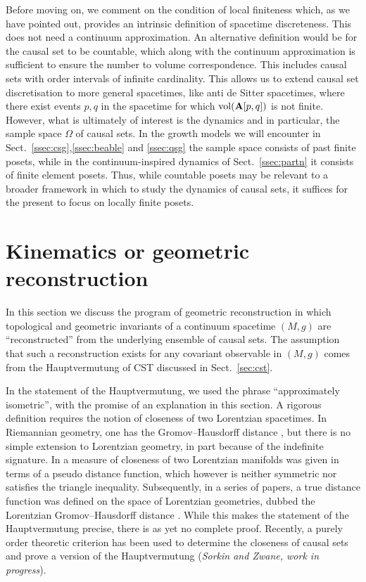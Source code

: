 Before moving on, we comment on the condition of local finiteness which, as we have pointed out,   provides an intrinsic
  definition of spacetime discreteness. This does not need a continuum approximation. An alternative definition would be
  for the causal set to be  countable, which along with the continuum approximation is sufficient to ensure the number
  to volume correspondence. This includes causal sets with  order intervals of infinite cardinality. This
  allows us to extend  causal set discretisation to more general spacetimes, like anti de Sitter spacetimes, where there
exist  events $p,q$ in the spacetime for which  $\mathrm{vol}(\mathbf A[p,q])$ is not finite. However, what is ultimately of
interest is the dynamics and in particular, the sample space $\Omega$ of causal sets. In the growth models we will encounter in 
Sect.~\ref{ssec:csg},\ref{ssec:beable} and \ref{ssec:qsg} the sample space consists of past finite posets, while in the
continuum-inspired dynamics of Sect.~\ref{ssec:partn} it consists of finite element posets. Thus, while countable posets may be relevant to a broader
framework in which to study the  dynamics of causal sets, it suffices for the present to focus on locally finite
posets. 



\section{Kinematics or geometric reconstruction}
\label{sec:kinematics} 

In this section we discuss the program of geometric reconstruction in which topological and geometric
invariants of a continuum spacetime $(M,g)$ are ``reconstructed'' from the  underlying ensemble of causal sets. The assumption that such a reconstruction
exists for any covariant observable in $(M,g)$ comes from the Hauptvermutung of CST discussed in Sect.~\ref{sec:cst}.


In the statement of the Hauptvermutung,  we used the phrase ``approximately
isometric'', with the promise of an explanation in this section.  A rigorous definition  requires the
notion of  closeness of two Lorentzian spacetimes. In Riemannian geometry, one has the Gromov--Hausdorff distance \citep{petersen}, but there is no simple extension to
Lorentzian geometry, in part because of the indefinite signature. In  \cite{bommeyer}  a measure of closeness of two Lorentzian manifolds was  given in terms of a pseudo distance
function, which however is neither symmetric nor satisfies the triangle inequality. 
Subsequently, in a series of papers,  a true distance function was defined on the space of Lorentzian
geometries, dubbed the Lorentzian Gromov--Hausdorff distance \citep{bomclose,noldusone,noldustwo,bomnoldus,bomnoldustwo}.  While this makes
the statement of the Hauptvermutung precise, there is as yet no complete proof. Recently, 
a purely order theoretic criterion has been used to determine the closeness of causal sets and  prove a version  of the
Hauptvermutung ({\it Sorkin and Zwane, work in progress}).   


